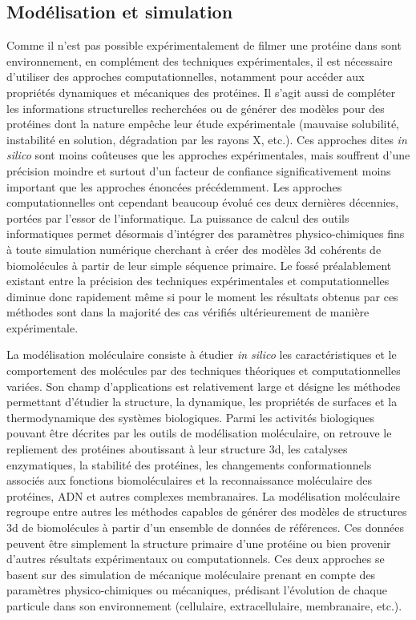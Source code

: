 \subsection{Modélisation et simulation}

Comme il n'est pas possible expérimentalement de filmer une protéine dans sont environnement, en complément des techniques expérimentales, il est nécessaire d'utiliser des approches computationnelles, notamment pour accéder aux propriétés dynamiques et mécaniques des protéines. Il s'agit aussi de compléter les informations structurelles recherchées ou de générer des modèles pour des protéines dont la nature empêche leur étude expérimentale (mauvaise solubilité, instabilité en solution, dégradation par les rayons X, etc.). Ces approches dites \textit{in silico} sont moins coûteuses que les approches expérimentales, mais souffrent d'une précision moindre et surtout d'un facteur de confiance significativement moins important que les approches énoncées précédemment. Les approches computationnelles ont cependant beaucoup évolué ces deux dernières décennies, portées par l'essor de l'informatique. La puissance de calcul des outils informatiques permet désormais d'intégrer des paramètres physico-chimiques fins à toute simulation numérique cherchant à créer des modèles 3d cohérents de biomolécules à partir de leur simple séquence primaire. Le fossé préalablement existant entre la précision des techniques expérimentales et computationnelles diminue donc rapidement même si pour le moment les résultats obtenus par ces méthodes sont dans la majorité des cas vérifiés ultérieurement de manière expérimentale.

La modélisation moléculaire consiste à étudier \textit{in silico} les caractéristiques et le comportement des molécules par des techniques théoriques et computationnelles variées. Son champ d'applications est relativement large et désigne les méthodes permettant d'étudier la structure, la dynamique, les propriétés de surfaces et la thermodynamique des systèmes biologiques. Parmi les activités biologiques pouvant être décrites par les outils de modélisation moléculaire, on retrouve le repliement des protéines aboutissant à leur structure 3d, les catalyses enzymatiques, la stabilité des protéines, les changements conformationnels associés aux fonctions biomoléculaires et la reconnaissance moléculaire des protéines, ADN et autres complexes membranaires.
La modélisation moléculaire regroupe entre autres les méthodes capables de générer des modèles de structures 3d de biomolécules à partir d'un ensemble de données de références. Ces données peuvent être simplement la structure primaire d'une protéine ou bien provenir d'autres résultats expérimentaux ou computationnels. Ces deux approches se basent sur des simulation de mécanique moléculaire prenant en compte des paramètres physico-chimiques ou mécaniques, prédisant l'évolution de chaque particule dans son environnement (cellulaire, extracellulaire, membranaire, etc.). 

